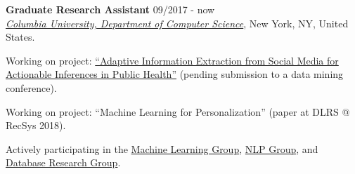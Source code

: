 \documentclass[letterpaper]{article}
\renewenvironment{itemize}{
  \begin{list}{}{
    \setlength{\leftmargin}{1.5em}
  }
}{
  \end{list}
}
\begin{document}
\begin{itemize}

\item 
    \textbf{Graduate Research Assistant} \hfill 09/2017 - now\\ 
    \href{https://www.cs.columbia.edu/}{\it Columbia University, Department of Computer Science}, New York, NY, United States.
    \begin{itemize}
        \item[-] Working on project: \href{http://publichealth.cs.columbia.edu/}{``Adaptive Information Extraction from Social Media for Actionable Inferences in Public Health''} (pending submission to a data mining conference).
        \item[-] Working on project: ``Machine Learning for Personalization'' (paper at DLRS @ RecSys 2018). 
        \item[-] Actively participating in the \href{http://www.cs.columbia.edu/areas/machine/}{Machine Learning Group}, \href{http://www.cs.columbia.edu/nlp/index.cgi}{NLP Group}, and \href{https://cudbg.github.io/}{Database Research Group}.
    \end{itemize}  
    

\end{itemize}
\end{document}
